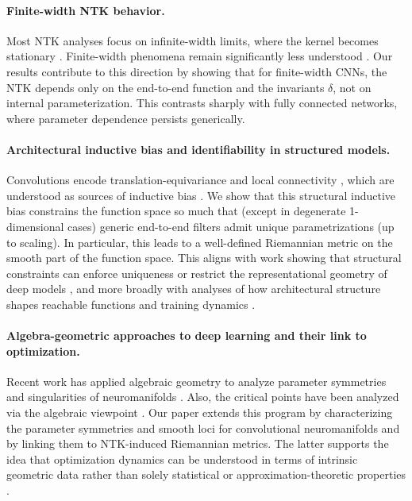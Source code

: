 \documentclass[twoside]{article}
\theoremstyle{definition}
\theoremstyle{remark}
\begin{document}
\paragraph{Finite-width NTK behavior.}
Most NTK analyses focus on infinite-width limits, where the kernel becomes stationary \cite{ntk,lee2019wide,arora2019fine}. Finite-width phenomena remain significantly less understood \cite{huang2020dynamics,nguyen2020global}. Our results contribute to this direction by showing that for finite-width CNNs, the NTK depends only on the end-to-end function and the invariants $\delta$, not on internal parameterization. This contrasts sharply with fully connected networks, where parameter dependence persists generically.

\paragraph{Architectural inductive bias and identifiability in structured models.}
Convolutions encode translation-equivariance and local connectivity \cite{lecun2002gradient,cohen2016group,mallat2016understanding}, which are understood as sources of inductive bias \cite{bietti2019inductive}. We show that this structural inductive bias constrains the function space so much that (except in degenerate 1-dimensional cases) generic end-to-end filters admit unique parametrizations (up to scaling). In particular, this leads to a well-defined Riemannian metric on the smooth part of the function space. This aligns with work showing that structural constraints can enforce uniqueness or restrict the representational geometry of deep models \cite{haeffele2015global,sedghi2018singular}, and more broadly with analyses of how architectural structure shapes reachable functions and training dynamics \cite{geiger2020scaling}.

\paragraph{Algebra-geometric approaches to deep learning and their link to optimization.}
Recent work has applied algebraic geometry to analyze parameter symmetries and singularities of neuromanifolds \cite{kileel2019expressive,kohn2024function,finkel2025activation,usevichidentifiability,massarenti2025alexander,arjevani2025geometry,shahverdigeometry,shahverdilearning,marchettiposition}. Also, the critical points have been analyzed via the algebraic viewpoint \cite{mehta2021loss,bharadwaj2023complex,shahverdi2025algebraic,graziani2026stable}. Our paper extends this program by characterizing the parameter symmetries and smooth loci for convolutional neuromanifolds and by linking them to NTK-induced Riemannian metrics. The latter supports the idea that optimization dynamics can be understood in terms of intrinsic geometric data rather than solely statistical or approximation-theoretic properties \cite{bronstein2021geometric,amari1998natural}.
\end{document}
